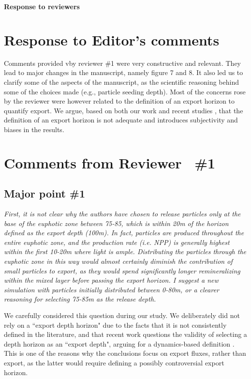 \documentclass[12pt,letter]{article}
\begin{document}
\begin{center}
\large
\textbf{
Response to reviewers\\}
\end{center}
\small

\section{Response to Editor's comments}

Comments provided vby reviewer \#1 were very constructive and relevant. They lead to major changes in the manuscript, namely figure 7 and 8. It also led us to clarify some of the aspects of the manuscript, as the scientific reasoning behind some of the choices made (e.g., particle seeding depth). Most of the concerns rose by the reviewer were however related to the definition of an export horizon to quantify export. We argue, based on both our work and recent studies \citep{Palevsky_2018}, that the definition of an export horizon is not adequate and introduces subjectivity and biases in the results.




\section{Comments from Reviewer  \#1}
\subsection*{Major point \#1}
\small
\textit{First, it is not clear why the authors have chosen to release particles only at the base of the euphotic zone between 75-85, which is within 20m of the horizon defined as the export depth (100m). In fact, particles are produced throughout the entire euphotic zone, and the production rate (i.e. NPP) is generally highest within the first 10-20m where light is ample. Distributing the particles through the euphotic zone in this way would almost certainly diminish the contribution of small particles to export, as they would spend significantly longer remineralizing within the mixed layer before passing the export horizon. I suggest a new simulation with particles initially distributed between 0-80m, or a clearer reasoning for selecting 75-85m as the release depth.\\}


We carefully considered this question during our study. We deliberately  did not rely on a ``export depth horizon" due to the facts that it is not consistently defined in the literature, and that recent work questions the validity of selecting a depth horizon as an ``export depth", arguing for a dynamics-based definition \citep{Palevsky_2018}. This is one of the reasons why the conclusions focus on export fluxes, rather than export, as the latter would require defining a possibly controversial export horizon.\\
			
\end{document}
